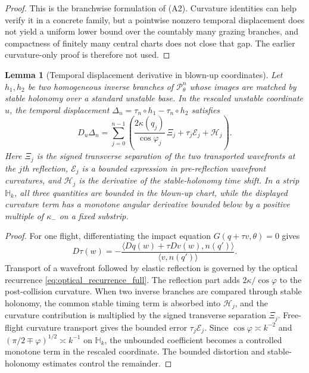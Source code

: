\documentclass[12pt, letterpaper]{amsart}
\newcommand{\Pcal}{\mathcal{P}}
\theoremstyle{plain}
\newtheorem{lemma}[theorem]{Lemma}
\theoremstyle{definition}
\theoremstyle{remark}
\begin{document}
\begin{proof}
This is the branchwise formulation of \textup{(A2)}.  Curvature identities can
help verify it in a concrete family, but a pointwise nonzero temporal
displacement does not yield a uniform lower bound over the countably many
grazing branches, and compactness of finitely many central charts does not close
that gap.  The earlier curvature-only proof is therefore not used.
\end{proof}

\begin{lemma}[Temporal displacement derivative in blown-up coordinates]
\label{lem:temporal_derivative_identity_blowup}
Let $h_1,h_2$ be two homogeneous inverse branches of $\Pcal_\theta^n$ whose
images are matched by stable holonomy over a standard unstable base.  In the
rescaled unstable coordinate $u$, the temporal displacement
$\Delta_n=\tau_n\circ h_1-\tau_n\circ h_2$ satisfies
\begin{equation}
\label{eq:temporal_derivative_identity_blowup}
    D_u\Delta_n
      =\sum_{j=0}^{n-1}
       \left(
       \frac{2\kappa(q_j)}{\cos\varphi_j}\,\Xi_j
       +\tau_j\mathcal E_j+\mathcal H_j
       \right).
\end{equation}
Here $\Xi_j$ is the signed transverse separation of the two transported
wavefronts at the $j$th reflection, $\mathcal E_j$ is a bounded expression in
pre-reflection wavefront curvatures, and $\mathcal H_j$ is the derivative of the
stable-holonomy time shift.  In a strip $\mathbb H_k$, all three quantities are
bounded in the blown-up chart, while the displayed curvature term has a
monotone angular derivative bounded below by a positive multiple of $\kappa_-$
on a fixed substrip.
\end{lemma}

\begin{proof}
For one flight, differentiating the impact equation
$G(q+\tau v,\theta)=0$ gives
\begin{equation}
    D\tau(w)=-\frac{\langle Dq(w)+\tau Dv(w),n(q')\rangle}
                    {\langle v,n(q')\rangle}.
\end{equation}
Transport of a wavefront followed by elastic reflection is governed by the
optical recurrence \eqref{eq:optical_recurrence_full}.  The reflection part
adds $2\kappa/\cos\varphi$ to the post-collision curvature.  When two inverse
branches are compared through stable holonomy, the common stable timing term is
absorbed into $\mathcal H_j$, and the curvature contribution is multiplied by
the signed transverse separation $\Xi_j$.  Free-flight curvature transport gives
the bounded error $\tau_j\mathcal E_j$.  Since $\cos\varphi\asymp k^{-2}$ and
$(\pi/2\mp\varphi)^{1/2}\asymp k^{-1}$ on $\mathbb H_k$, the unbounded
coefficient becomes a controlled monotone term in the rescaled coordinate.  The
bounded distortion and stable-holonomy estimates control the remainder.
\end{proof}
\end{document}
